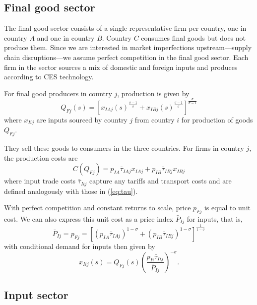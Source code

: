 \documentclass{article}
\begin{document}
\subsection{Final good sector}

The final good sector consists of a single representative firm per country, one in country $A$ and one in country $B$. Country $C$ consumes final goods but does not produce them. Since we are interested in market imperfections upstream---supply chain disruptions---we assume perfect competition in the final good sector. Each firm in the sector sources a mix of domestic and foreign inputs and produces according to CES technology. 

For final good producers in country $j$, production is given by
\begin{equation} \label{eq:prod_final}
    Q_{Fj}(s) = \left[ x_{IAj}(s)^\frac{\sigma-1}{\sigma} + x_{IBj}(s)^\frac{\sigma-1}{\sigma} \right]^\frac{\sigma}{\sigma-1}
\end{equation}
where $x_{Iij}$ are inputs sourced by country $j$ from country $i$ for production of goods $Q_{Fj}$. 

They sell these goods to consumers in the three countries. For firms in country $j$, the production costs are
\begin{equation}
    C(Q_{Fj}) = p_{IA} \bar{\tau}_{IAj} x_{IAj} + p_{IB} \bar{\tau}_{IBj} x_{IBj}
\end{equation}
where input trade costs $\bar{\tau}_{Iij}$ capture any tariffs and transport costs and are defined analogously with those in (\ref{eq:tau}).

With perfect competition and constant returns to scale, price $p_{Fj}$ is equal to unit cost. We can also express this unit cost as a price index $\bar{P}_{Ij}$ for inputs, that is,
\begin{equation}
    \bar{P}_{Ij} = p_{Fj} = \left[ ( p_{IA} \bar{\tau}_{IAj} )^{1 - \sigma} + ( p_{IB} \bar{\tau}_{IBj} )^{1 - \sigma} \right]^{\frac{1}{1 - \sigma}}
\end{equation}
with conditional demand for inputs then given by
\begin{equation} \label{eq:input_demand}
    x_{Iij}(s) = Q_{Fj}(s) \left( \frac{p_{Ii} \bar{\tau}_{Iij}}{\bar{P}_{Ij}} \right)^{-\sigma}.
\end{equation}

\subsection{Input sector}
\end{document}
